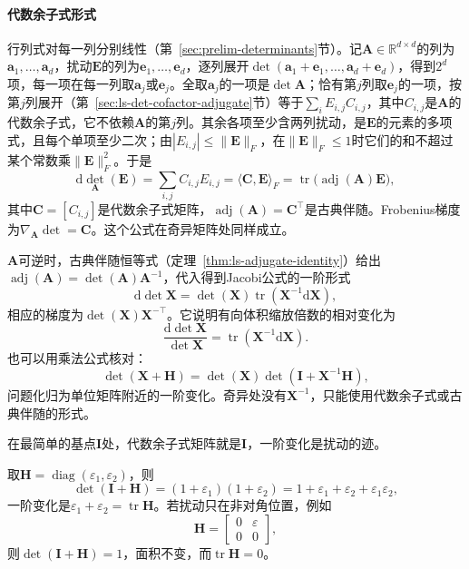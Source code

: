 \paragraph{代数余子式形式}
行列式对每一列分别线性（第~\ref{sec:prelim-determinants}节）。记$\bm A\in\mathbb R^{d\times d}$的列为$\bm a_1,\ldots,\bm a_d$，扰动$\bm E$的列为$\bm e_1,\ldots,\bm e_d$，逐列展开$\det(\bm a_1+\bm e_1,\ldots,\bm a_d+\bm e_d)$，得到$2^d$项，每一项在每一列取$\bm a_j$或$\bm e_j$。全取$\bm a_j$的一项是$\det\bm A$；恰有第$j$列取$\bm e_j$的一项，按第$j$列展开（第~\ref{sec:ls-det-cofactor-adjugate}节）等于$\sum_iE_{i,j}C_{i,j}$，其中$C_{i,j}$是$\bm A$的代数余子式，它不依赖$\bm A$的第$j$列。其余各项至少含两列扰动，是$\bm E$的元素的多项式，且每个单项至少二次；由$|E_{i,j}|\leq\lVert\bm E\rVert_F$，在$\lVert\bm E\rVert_F\leq1$时它们的和不超过某个常数乘$\lVert\bm E\rVert_F^2$。于是
\begin{equation}
 \mathrm d\det_{\bm A}(\bm E)=\sum_{i,j}C_{i,j}E_{i,j}=\langle\bm C,\bm E\rangle_F=\operatorname{tr}\bigl(\operatorname{adj}(\bm A)\bm E\bigr),
\label{eq:multivariable-determinant-cofactor-differential}
\end{equation}
其中$\bm C=[C_{i,j}]$是代数余子式矩阵，$\operatorname{adj}(\bm A)=\bm C^\top$是古典伴随。Frobenius梯度为$\nabla_{\bm A}\det=\bm C$。这个公式在奇异矩阵处同样成立。

$\bm A$可逆时，古典伴随恒等式（定理~\ref{thm:ls-adjugate-identity}）给出$\operatorname{adj}(\bm A)=\det(\bm A)\bm A^{-1}$，代入得到Jacobi公式的一阶形式
\[
 \mathrm{d}\det\bm{X}=\det(\bm{X})\operatorname{tr}(\bm{X}^{-1}\mathrm{d}\bm{X}),
\]
相应的梯度为$\det(\bm X)\bm X^{-\top}$。它说明有向体积缩放倍数的相对变化为
\[
 \frac{\mathrm d\det\bm X}{\det\bm X}=\operatorname{tr}(\bm X^{-1}\mathrm d\bm X).
\]
也可以用乘法公式核对：
\[
 \det(\bm X+\bm H)=\det(\bm X)\det(\bm I+\bm X^{-1}\bm H),
\]
问题化归为单位矩阵附近的一阶变化。奇异处没有$\bm X^{-1}$，只能使用代数余子式或古典伴随的形式。

在最简单的基点$\bm I$处，代数余子式矩阵就是$\bm I$，一阶变化是扰动的迹。
\begin{example}[单位矩阵附近行列式的一阶变化]
\label{ex:multivariable-determinant-near-identity}
取$\bm H=\operatorname{diag}(\varepsilon_1,\varepsilon_2)$，则
\[
 \det(\bm I+\bm H)=(1+\varepsilon_1)(1+\varepsilon_2)=1+\varepsilon_1+\varepsilon_2+\varepsilon_1\varepsilon_2,
\]
一阶变化是$\varepsilon_1+\varepsilon_2=\operatorname{tr}\bm H$。若扰动只在非对角位置，例如
\[
 \bm H=\begin{bmatrix}0&\varepsilon\\0&0\end{bmatrix},
\]
则$\det(\bm I+\bm H)=1$，面积不变，而$\operatorname{tr}\bm H=0$。
\end{example}

